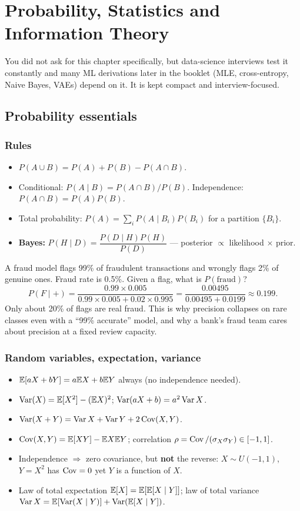 \chapter{Probability, Statistics and Information Theory}

You did not ask for this chapter specifically, but data-science interviews test it constantly and many ML derivations later in the booklet (MLE, cross-entropy, Naive Bayes, VAEs) depend on it. It is kept compact and interview-focused.

\section{Probability essentials}

\subsection{Rules}
\begin{itemize}
  \item $P(A\cup B)=P(A)+P(B)-P(A\cap B)$.
  \item Conditional: $P(A\mid B)=P(A\cap B)/P(B)$. Independence: $P(A\cap B)=P(A)P(B)$.
  \item Total probability: $P(A)=\sum_iP(A\mid B_i)P(B_i)$ for a partition $\{B_i\}$.
  \item \textbf{Bayes:} $P(H\mid D)=\dfrac{P(D\mid H)P(H)}{P(D)}$ --- posterior $\propto$ likelihood $\times$ prior.
\end{itemize}

\begin{example}
A fraud model flags 99\% of fraudulent transactions and wrongly flags 2\% of genuine ones. Fraud rate is 0.5\%. Given a flag, what is $P(\text{fraud})$?
\[P(F\mid +)=\frac{0.99\times0.005}{0.99\times0.005+0.02\times0.995}=\frac{0.00495}{0.00495+0.0199}\approx0.199.\]
Only about 20\% of flags are real fraud. This is why precision collapses on rare classes even with a ``99\% accurate'' model, and why a bank's fraud team cares about precision at a fixed review capacity.
\end{example}

\subsection{Random variables, expectation, variance}
\begin{itemize}
  \item $\mathbb{E}[aX+bY]=a\mathbb{E} X+b\mathbb{E} Y$ always (no independence needed).
  \item $\operatorname{Var}(X)=\mathbb{E}[X^2]-(\mathbb{E} X)^2$; $\operatorname{Var}(aX+b)=a^2\operatorname{Var} X$.
  \item $\operatorname{Var}(X+Y)=\operatorname{Var} X+\operatorname{Var} Y+2\operatorname{Cov}(X,Y)$.
  \item $\operatorname{Cov}(X,Y)=\mathbb{E}[XY]-\mathbb{E} X\mathbb{E} Y$; correlation $\rho=\operatorname{Cov}/(\sigma_X\sigma_Y)\in[-1,1]$.
  \item Independence $\Rightarrow$ zero covariance, but \textbf{not} the reverse: $X\sim U(-1,1)$, $Y=X^2$ has $\operatorname{Cov}=0$ yet $Y$ is a function of $X$.
  \item Law of total expectation $\mathbb{E}[X]=\mathbb{E}[\mathbb{E}[X\mid Y]]$; law of total variance $\operatorname{Var} X=\mathbb{E}[\operatorname{Var}(X\mid Y)]+\operatorname{Var}(\mathbb{E}[X\mid Y])$.
\end{itemize}


